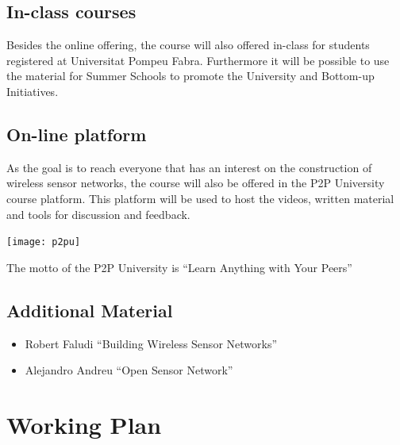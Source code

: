 \documentclass{tufte-book} %
\begin{document}

\section{In-class courses}
Besides the online offering, the course will also offered in-class for students registered at Universitat Pompeu Fabra.
Furthermore it will be possible to use the material for Summer Schools to promote the University and Bottom-up Initiatives.

\section{On-line platform}

As the goal is to reach everyone that has an interest on the construction of wireless sensor networks, the course will also be offered in the P2P University course platform.
This platform will be used to host the videos, written material and tools for discussion and feedback.

\begin{marginfigure}
\texttt{[image: p2pu]}
\caption{The motto of the P2P University is ``Learn Anything with Your Peers''}
\label{fig:p2pu}
\end{marginfigure}

\section{Additional Material}

\begin{itemize}
\item Robert Faludi ``Building Wireless Sensor Networks''
\item Alejandro Andreu ``Open Sensor Network''
\end{itemize}



\chapter{Working Plan}
\end{document}
